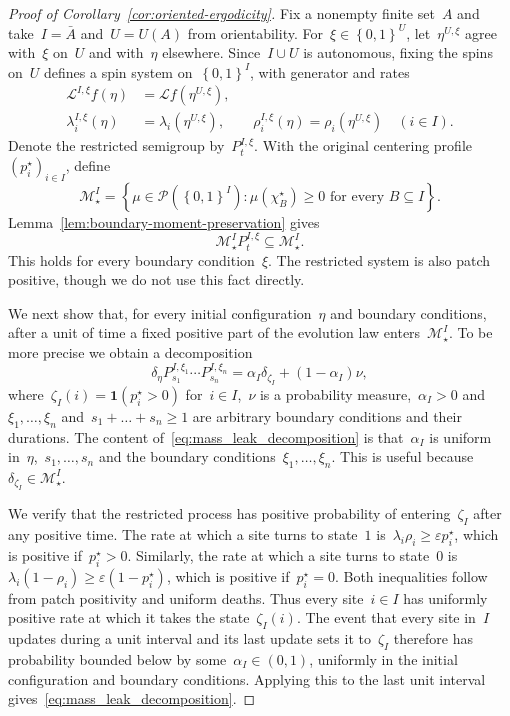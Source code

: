 \documentclass[EJP,preprint,NODS,nobera]{ejpecp}
\newcommand{\bb}[1]{\left(#1\right)}
\newcommand{\cb}[1]{\left\{#1\right\}}
\newcommand{\ind}{\mathbf{1}}
\newcommand{\Lcal}{\mathcal{L}}
\begin{document}
\begin{proof}[Proof of Corollary~\ref{cor:oriented-ergodicity}]
    

Fix a nonempty finite set~$A$ and take~$I=\bar A$ and~$U=U(A)$ from
orientability. For~$\xi\in\cb{0,1}^U$, let~$\eta^{U,\xi}$ agree with~$\xi$
on~$U$ and with~$\eta$ elsewhere. Since~$I\cup U$ is autonomous, fixing
the spins on~$U$ defines a spin system on~$\cb{0,1}^I$, with generator
and rates
\begin{align*}
\Lcal^{I,\xi}f(\eta)&=\Lcal f(\eta^{U,\xi}),\\
\lambda_i^{I,\xi}(\eta)&=\lambda_i(\eta^{U,\xi}),
\qquad
\rho_i^{I,\xi}(\eta)=\rho_i(\eta^{U,\xi})
\quad(i\in I).
\end{align*}
Denote the restricted semigroup by~$P_t^{I,\xi}$. With the original centering profile~$(p_i^\star)_{i\in I}$, define
\begin{equation*}
\mathcal M_\star^I
=\cb{\mu\in\mathcal P\bb{\cb{0,1}^I}:
       \mu(\chi_B^\star)\geq0\text{ for every }B\subseteq I}.
\end{equation*}
Lemma~\ref{lem:boundary-moment-preservation} gives
\begin{equation*}
\mathcal M_\star^I P_t^{I,\xi}\subseteq\mathcal M_\star^I.
\end{equation*}
This holds for every boundary condition~$\xi$. The restricted system is also patch positive, though we do not use this fact directly.

We next show that, for every initial configuration~$\eta$ and boundary conditions, after a unit of time a fixed positive part of the evolution law enters~$\mathcal{M}_\star^I$. To be more precise we obtain a decomposition
\begin{equation}\label{eq:mass_leak_decomposition}
    \delta_\eta P_{s_1}^{I,\xi_1}\cdots P_{s_n}^{I,\xi_n} = \alpha_I \delta_{\zeta_I} + \bb{1-\alpha_I}\nu,
\end{equation}
where~$\zeta_I(i) = \ind\bb{p_i^\star > 0}$ for~$i\in I$,~$\nu$ is a probability measure,~$\alpha_I>0$ and~$\xi_1,\dots,\xi_n$ and~$s_1+\dots +s_n\geq 1$ are arbitrary boundary conditions and their durations. The content of~\eqref{eq:mass_leak_decomposition} is that~$\alpha_I$ is uniform in~$\eta$,~$s_1,\dots,s_n$ and the boundary conditions~$\xi_1,\dots,\xi_n$. This is useful because~$\delta_{\zeta_I}\in\mathcal{M}_\star^I$.

We verify that the restricted process has positive probability of entering~$\zeta_I$ after any positive time. The rate at which a site turns to state~$1$ is~$\lambda_i\rho_i  \geq \varepsilon p_i^\star$, which is positive if~$p_i^\star>0$. Similarly, the rate at which a site turns to state~$0$ is~$\lambda_i\bb{1 - \rho_i}\geq \varepsilon \bb{1-p_i^\star}$, which is positive if~$p_i^\star = 0$. Both inequalities follow from patch positivity and uniform deaths. Thus every site~$i\in I$ has uniformly positive rate at which it takes the state~$\zeta_I(i)$. The event that every site in~$I$ updates during a unit interval and its last update sets it to~$\zeta_I$ therefore has probability bounded below by some~$\alpha_I\in(0,1)$, uniformly in the initial configuration and boundary conditions. Applying this to the last unit interval gives~\eqref{eq:mass_leak_decomposition}.


\end{proof}
\end{document}
